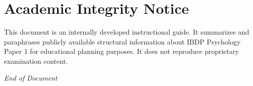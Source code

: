 \documentclass[12pt,a4paper]{article}
\begin{document}
\section*{Academic Integrity Notice}

This document is an internally developed instructional guide. 
It summarizes and paraphrases publicly available structural information 
about IBDP Psychology Paper 1 for educational planning purposes. 
It does not reproduce proprietary examination content.

\vfill

\begin{center}
\textit{End of Document}
\end{center}
\end{document}
